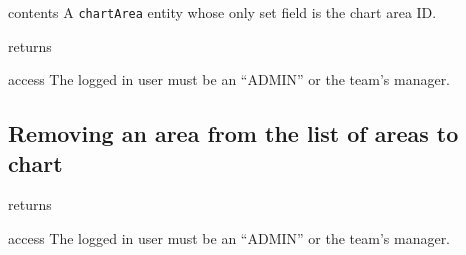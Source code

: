 \begin{apidata}{contents}
  A \texttt{chartArea} entity whose only set field is the chart area ID.
\end{apidata}
\begin{apidata}{returns}
  \begin{datalist}
  \end{datalist}
\end{apidata}
\begin{apidata}{access}
The logged in user must be an ``ADMIN'' or the team's manager.
\end{apidata}


\subsection{Removing an area from the list of areas to chart}

\begin{apidata}{returns}
  \begin{datalist}
  \end{datalist}
\end{apidata}
\begin{apidata}{access}
The logged in user must be an ``ADMIN'' or the team's manager.
\end{apidata}



